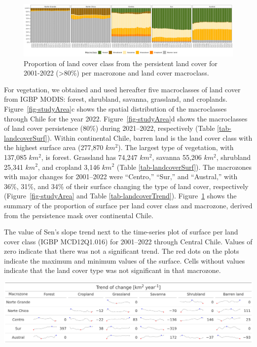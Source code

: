 \documentclass[
  authoryear,
  preprint,
  3p,
  onecolumn]{elsarticle}
\begin{document}
\begin{figure}[!ht]

{\centering \includegraphics{../output/figs/proportion_landcover_macroclass_2001-2022.png}

}

\caption{\label{fig-LCprop}Proportion of land cover class from the
persistent land cover for 2001-2022 (\textgreater80\%) per macrozone and
land cover macroclass.}

\end{figure}

For vegetation, we obtained and used hereafter five macroclasses of land
cover from IGBP MODIS: forest, shrubland, savanna, grassland, and
croplands. Figure~\ref{fig-studyArea}c shows the spatial distribution of
the macroclasses through Chile for the year 2022.
Figure~\ref{fig-studyArea}d shows the macroclasses of land cover
persistence (80\%) during 2021--2022, respectively (Table
\ref{tab-landcoverSurf}). Within continental Chile, barren land is the
land cover class with the highest surface area (277,870 \(km^2\)). The
largest type of vegetation, with 137,085 \(km^2\), is forest. Grassland
has 74,247 \(km^2\), savanna 55,206 \(km^2\), shrubland 25,341 \(km^2\),
and cropland 3,146 \(km^2\) (Table \ref{tab-landcoverSurf}). The
macrozones with major changes for 2001--2022 were ``Centro,'' ``Sur,''
and ``Austral,'' with 36\%, 31\%, and 34\% of their surface changing the
type of land cover, respectively (Figure~\ref{fig-studyArea} and Table
\ref{tab-landcoverTrend}). Figure~\ref{fig-LCprop} shows the summary of
the proportion of surface per land cover class and macrozone, derived
from the persistence mask over continental Chile.

\begin{table}[!ht]
\caption{The value of Sen's slope trend next to the time-series plot of surface per land cover class (IGBP MCD12Q1.016) for 2001–2022 through Central Chile. Values of zero indicate that there was not a significant trend. The red dots on the plots indicate the maximum and minimum values of the surface. Cells without values indicate that the land cover type was not significant in that macrozone.}
\label{tab-landcoverTrend}
\includegraphics[]{../output/figs/table_var_landcover_macro.png}
\end{table}
\end{document}
